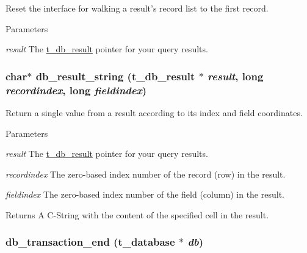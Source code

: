 Reset the interface for walking a result's record list to the first record. 
\begin{DoxyParams}{Parameters}
\item[{\em result}]The \hyperlink{group__database_gae34db00cb98960e94b5ca58a7c21c362}{t\_\-db\_\-result} pointer for your query results. \end{DoxyParams}
\hypertarget{group__database_ga57619b568083f0cf5989455af0ad3d5b}{
\subsubsection[{db\_\-result\_\-string}]{\setlength{\rightskip}{0pt plus 5cm}char$\ast$ db\_\-result\_\-string ({\bf t\_\-db\_\-result} $\ast$ {\em result}, \/  long {\em recordindex}, \/  long {\em fieldindex})}}
\label{group__database_ga57619b568083f0cf5989455af0ad3d5b}


Return a single value from a result according to its index and field coordinates. 
\begin{DoxyParams}{Parameters}
\item[{\em result}]The \hyperlink{group__database_gae34db00cb98960e94b5ca58a7c21c362}{t\_\-db\_\-result} pointer for your query results. \item[{\em recordindex}]The zero-\/based index number of the record (row) in the result. \item[{\em fieldindex}]The zero-\/based index number of the field (column) in the result. \end{DoxyParams}
\begin{DoxyReturn}{Returns}
A C-\/String with the content of the specified cell in the result. 
\end{DoxyReturn}
\hypertarget{group__database_ga03a64b223d17437a2a7eb976025b5874}{
\subsubsection[{db\_\-transaction\_\-end}]{ db\_\-transaction\_\-end ({\bf t\_\-database} $\ast$ {\em db})}}
\label{group__database_ga03a64b223d17437a2a7eb976025b5874}


